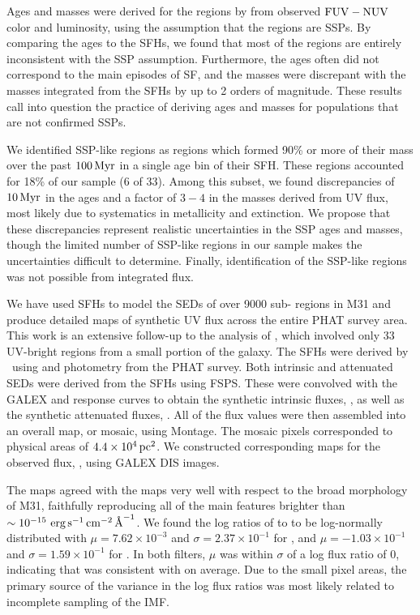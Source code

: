 Ages and masses were derived for the regions by  from
observed $\mathrm{FUV} - \mathrm{NUV}$ color and \fuv{} luminosity, using the assumption that
the regions are SSPs. By comparing the ages to the SFHs, we found that most of
the regions are entirely inconsistent with the SSP assumption. Furthermore, the
ages often did not correspond to the main episodes of SF, and the masses were
discrepant with the masses integrated from the SFHs by up to 2 orders of
magnitude. These results call into question the practice of deriving ages and
masses for populations that are not confirmed SSPs.

We identified SSP-like regions as regions which formed 90\% or more of their
mass over the past $100\,\mathrm{Myr}$ in a single age bin of their SFH. These
regions accounted for 18\% of our sample (6 of 33). Among this subset, we found
discrepancies of $10\,\mathrm{Myr}$ in the ages and a factor of $3-4$ in the
masses derived from UV flux, most likely due to systematics in metallicity and
extinction. We propose that these discrepancies represent realistic
uncertainties in the SSP ages and masses, though the limited number of SSP-like
regions in our sample makes the uncertainties difficult to determine. Finally,
identification of the SSP-like regions was not possible from integrated \fuv{}
flux.

We have used SFHs to model the SEDs of over 9000 sub-\kpc{} regions in M31 and
produce detailed maps of synthetic UV flux across the entire PHAT survey area.
This work is an extensive follow-up to the analysis of \citet{Simones:2014},
which involved only 33 UV-bright regions from a small portion of the galaxy.
The SFHs were derived by \citet{Lewis:2014}\ using \acsb{} and \acsi{}
photometry from the PHAT survey. Both intrinsic and attenuated SEDs were
derived from the SFHs using FSPS. These were convolved with the GALEX \fuv{}
and \nuv{} response curves to obtain the synthetic intrinsic fluxes, \fxsfhz{},
as well as the synthetic attenuated fluxes, \fxsfh{}. All of the flux values
were then assembled into an overall map, or mosaic, using Montage. The mosaic
pixels corresponded to physical areas of $4.4\times 10^4\,\mathrm{pc}^2$. We constructed
corresponding maps for the observed flux, \fxobs{}, using GALEX DIS images.

The \fxsfh{} maps agreed with the \fxobs{} maps very well with respect to the
broad morphology of M31, faithfully reproducing all of the main features
brighter than $\sim 10^{-15}\, \,\mathrm{erg}\,\mathrm{s}^{-1}\,\mathrm{cm}^{-2}\,\textrm{\AA}^{-1}$. We found the log ratios of \fxsfh{} to
\fxobs{} to be log-normally distributed with $\mu = 7.62\times 10^{-3}$ and
$\sigma = 2.37\times 10^{-1}$ for \fuv{}, and $\mu = -1.03\times 10^{-1}$ and
$\sigma = 1.59\times 10^{-1}$ for \nuv{}. In both filters, $\mu$ was within
$\sigma$ of a log flux ratio of 0, indicating that \fxsfh{} was consistent with
\fxobs{} on average. Due to the small pixel areas, the primary source of the
variance in the log flux ratios was most likely related to incomplete sampling
of the IMF.

